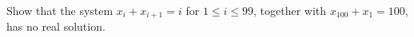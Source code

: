 Show that the system $x_i+x_{i+1}=i$ for $1\le i\le99$, together with $x_{100}+x_1=100$, has no real solution.
